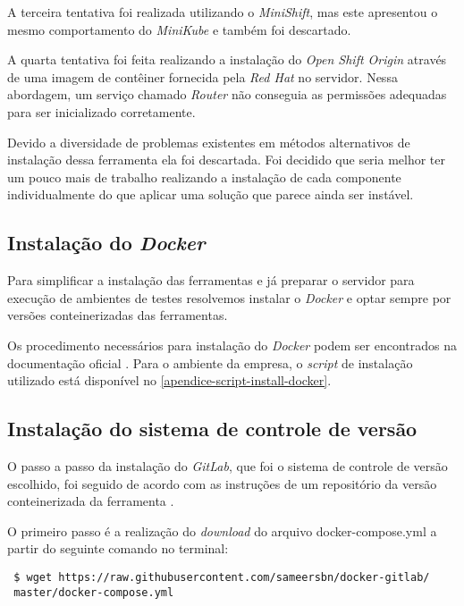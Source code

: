 \documentclass[
	12pt,				%
	openright,			%
	oneside,			%
	a4paper,			%
	english,			%
	french,				%
	spanish,			%
	brazil,				%
	]{abntex2}
\begin{document}
A terceira tentativa foi realizada utilizando o \textit{MiniShift}, mas este apresentou o mesmo comportamento do \textit{MiniKube} e também foi descartado.

A quarta tentativa foi feita realizando a instalação do \textit{Open Shift Origin} através de uma imagem de contêiner fornecida pela \textit{Red Hat} no servidor\cite{OpenShift:InstallGuide}. Nessa abordagem, um serviço chamado \textit{Router} não conseguia as permissões adequadas para ser inicializado corretamente. 

Devido a diversidade de problemas existentes em métodos alternativos de instalação dessa ferramenta ela foi descartada. Foi decidido que seria melhor ter um pouco mais de trabalho realizando a instalação de cada componente individualmente do que aplicar uma solução que parece ainda ser instável.

\subsection{Instalação do \textit{Docker}}

Para simplificar a instalação das ferramentas e já preparar o servidor para execução de ambientes de testes resolvemos instalar o \textit{Docker} e optar sempre por versões conteinerizadas das ferramentas.

Os procedimento necessários para instalação do \textit{Docker} podem ser encontrados na documentação oficial \cite{Docker:InstallGuide}. Para o ambiente da empresa, o \textit{script} de instalação utilizado está disponível no \autoref{apendice-script-install-docker}.

\subsection{Instalação do sistema de controle de versão}

O passo a passo da instalação do \textit{GitLab}, que foi o sistema de controle de versão escolhido, foi seguido de acordo com as instruções de um repositório da versão conteinerizada da ferramenta \cite{GitHub:GitLabDocker}.

O primeiro passo é a realização do \textit{download} do arquivo docker-compose.yml a partir do seguinte comando no terminal:

 \begin{lstlisting}
 $ wget https://raw.githubusercontent.com/sameersbn/docker-gitlab/
 master/docker-compose.yml
 \end{lstlisting}
 
\end{document}
